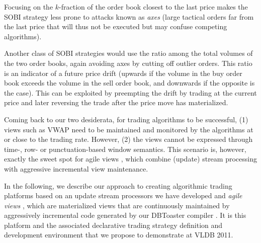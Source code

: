 \begin{example}
Focusing on the $k$-fraction of the order book closest to the last price
makes the SOBI strategy less prone to attacks known as {\em axes}\/ (large
tactical orders far from the last price that will thus not be executed but
may confuse competing algorithms).

Another class of SOBI strategies would use the ratio
among the total volumes of the two order books, again avoiding axes by cutting off
outlier orders. This ratio is an indicator of a future price drift (upwards if
the volume in the buy order book exceeds the volume in the sell order book,
and downwards if the opposite is the case). This can be exploited by preempting
the drift by trading at the current price and later reversing the trade after the price move has materialized.
\punto
\end{example}


Coming back to our two desiderata, for trading algorithms to be successful, (1)
views such as VWAP need to be maintained and monitored by the algorithms at or
close to the trading rate. However, (2) the views cannot be expressed through
time-, row- or punctuation-based window semantics.
This scenario is, however, exactly the sweet spot for agile views
\cite{KAK2011}, which combine (update) stream processing with aggressive
incremental view maintenance.

In the following, we describe our approach to creating algorithmic
trading platforms based on an update stream processors we have developed and
{\em agile views}\/ \cite{KAK2011}, which are materialized views
that are continuously maintained by aggressively incremental code generated
by our DBToaster compiler \cite{ahmad-vldb:09,koch-pods:10,KAK2011}.
It is this platform and the
associated declarative trading strategy definition and development environment
that we propose to demonstrate at VLDB 2011.


